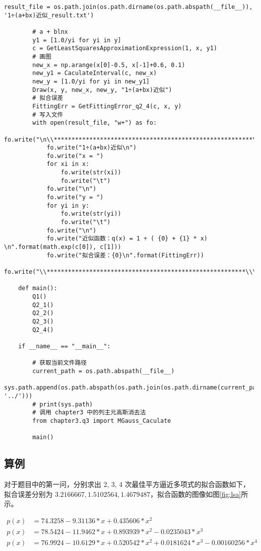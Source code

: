 \begin{lstlisting}[style = python]
        result_file = os.path.join(os.path.dirname(os.path.abspath(__file__)), '1÷(a+bx)近似_result.txt')

        # a + blnx
        y1 = [1.0/yi for yi in y]
        c = GetLeastSquaresApproximationExpression(1, x, y1)
        # 画图
        new_x = np.arange(x[0]-0.5, x[-1]+0.6, 0.1)
        new_y1 = CaculateInterval(c, new_x)
        new_y = [1.0/yi for yi in new_y1]
        Draw(x, y, new_x, new_y, "1÷(a+bx)近似")
        # 拟合误差
        FittingErr = GetFittingError_q2_4(c, x, y)
        # 写入文件
        with open(result_file, "w+") as fo:
            fo.write("\n\\********************************************************\\\n")
            fo.write("1÷(a+bx)近似\n")
            fo.write("x = ")
            for xi in x:
                fo.write(str(xi))
                fo.write("\t")
            fo.write("\n")
            fo.write("y = ")
            for yi in y:
                fo.write(str(yi))
                fo.write("\t")
            fo.write("\n")
            fo.write("近似函数：q(x) = 1 ÷ ( {0} + {1} * x) \n".format(math.exp(c[0]), c[1]))
            fo.write("拟合误差：{0}\n".format(FittingErr))
            fo.write("\\********************************************************\\\n")

    def main():
        Q1()
        Q2_1()
        Q2_2()
        Q2_3()
        Q2_4()

    if __name__ == "__main__":

        # 获取当前文件路径
        current_path = os.path.abspath(__file__)
        sys.path.append(os.path.abspath(os.path.join(os.path.dirname(current_path), '../')))
        # print(sys.path)
        # 调用 chapter3 中的列主元高斯消去法
        from chapter3.q3 import MGauss_Caculate

        main()
\end{lstlisting}

\subsection{算例}

对于题目中的第一问，分别求出 2, 3, 4 次最佳平方逼近多项式的拟合函数如下，拟合误差分别为 $3.2166667,1.5102564,1.4679487$，拟合函数的图像如图\ref{fig:lsa}所示。

\begin{align}
    p(x) &= 74.3258 -9.31136*x + 0.435606*x^2 \\
    p(x) &= 78.5424 - 11.9462*x + 0.893939*x^2 -0.0235043*x^3 \\
    p(x) &= 76.9924 - 10.6129*x + 0.520542*x^2 + 0.0181624*x^3 -0.00160256*x^4
\end{align}

